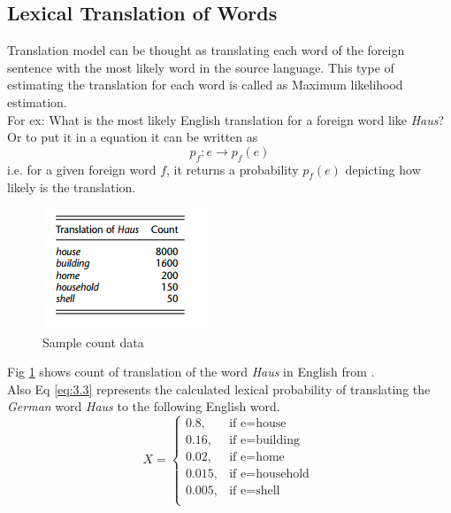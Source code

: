 \subsection{Lexical Translation of Words}
Translation model can be thought as translating each word of the foreign sentence with the most likely word in the source language. This type of estimating the translation for each word is called as Maximum likelihood estimation.\\
For ex: What is the most likely English translation for a foreign word like \textit{Haus}?\cite{koehn}\\ 
Or to put it in a equation it can be written as\\
\begin{equation}
p_{f}: e \rightarrow p_{f}(e)
\end{equation}
i.e. for a given foreign word $f$, it returns a probability $p_{f}(e)$ depicting how likely is the translation. 
\begin{figure}
        \centering
        \includegraphics[scale=0.6]{Images/table1}
        \caption{Sample count data}
        \label{fig:count}
\end{figure}
Fig \ref{fig:count} shows count of translation of the word \textit{Haus} in English from \cite{koehn}.\\
Also Eq \ref{eq:3.3} represents the calculated lexical probability of translating the \textit{German} word \textit{Haus} to the following English word. \\

\begin{equation} \label{eq:3.3}
    X=
    \begin{cases}
      0.8, & \text{if e=house}\ \\
      0.16, & \text{if e=building}\ \\
      0.02, & \text{if e=home}\ \\
      0.015, & \text{if e=household}\ \\
      0.005, & \text{if e=shell}\ \\
    \end{cases}
\end{equation}
    
